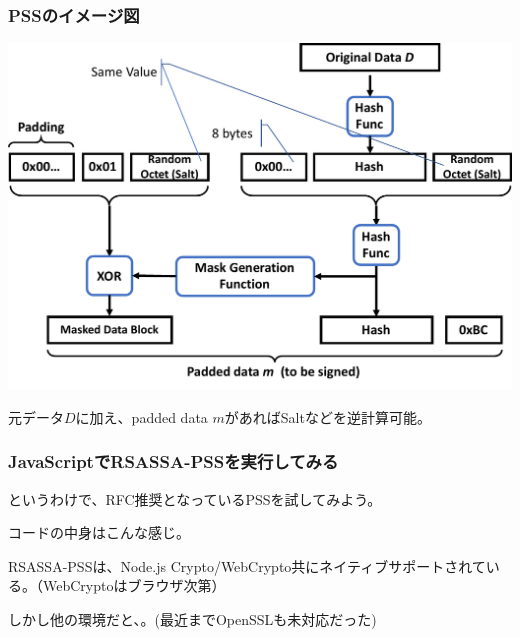 \documentclass[12pt,dvipdfmx]{beamer}
\begin{document}
\begin{frame}
\frametitle{PSSのイメージ図}
\begin{center}
\includegraphics[width=0.8\linewidth]{Figs/pss.pdf}
\end{center}
元データ$D$に加え、padded data $m$があればSaltなどを逆計算可能。
\end{frame}


\begin{frame}
\frametitle{JavaScriptでRSASSA-PSSを実行してみる}
というわけで、RFC推奨となっているPSSを試してみよう。
\end{frame}

\begin{frame}
コードの中身はこんな感じ。
\end{frame}

\begin{frame}
RSASSA-PSSは、Node.js Crypto/WebCrypto共にネイティブサポートされている。（WebCryptoはブラウザ次第）

しかし他の環境だと、。(最近までOpenSSLも未対応だった)
\end{frame}
\end{document}
